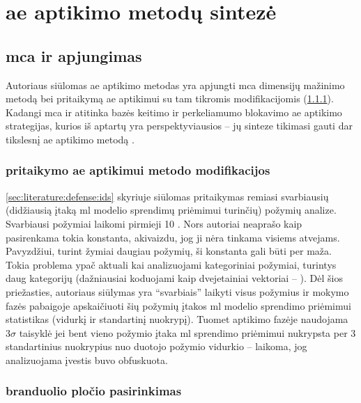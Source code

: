 \section{\gls{ae} aptikimo metodų sintezė}

\subsection{\gls{mca} ir \LIME apjungimas}
Autoriaus siūlomas \gls{ae} aptikimo metodas yra apjungti \gls{mca} dimensijų mažinimo metodą bei \LIME pritaikymą \gls{ae} aptikimui su tam tikromis modifikacijomis (\ref{sec:method:mods}). Kadangi \gls{mca} ir \LIME atitinka bazės keitimo  ir perkeliamumo blokavimo  \gls{ae} aptikimo strategijas, kurios iš aptartų yra perspektyviausios -- jų sinteze tikimasi gauti dar tikslesnį \gls{ae} aptikimo metodą .

\subsubsection{\LIME pritaikymo \gls{ae} aptikimui metodo modifikacijos}\label{sec:method:mods}
\ref{sec:literature:defense:ids} skyriuje siūlomas \LIME pritaikymas remiasi svarbiausių (didžiausią įtaką \gls{ml} modelio sprendimų priėmimui turinčių) požymių analize. Svarbiausi požymiai laikomi pirmieji 10 \cite{tcydenovaDetectionAdversarialAttacks2021}. Nors autoriai neaprašo kaip pasirenkama tokia konstanta, akivaizdu, jog ji nėra tinkama visiems atvejams. Pavyzdžiui, turint žymiai daugiau požymių, ši konstanta gali būti per maža. Tokia problema ypač aktuali kai analizuojami kategoriniai požymiai, turintys daug kategorijų (dažniausiai koduojami kaip dvejetainiai vektoriai -- ). Dėl šios priežasties, autoriaus siūlymas yra \enquote{svarbiais} laikyti visus požymius ir mokymo fazės pabaigoje apskaičiuoti šių požymių įtakos \gls{ml} modelio sprendimo priėmimui statistikas (vidurkį ir standartinį nuokrypį). Tuomet aptikimo fazėje naudojama $3 \sigma$ taisyklė \cite{pukelsheimThreeSigmaRule1994} \ty jei bent vieno požymio įtaka \gls{ml} sprendimo priėmimui nukrypsta per 3 standartinius nuokrypius nuo duotojo požymio vidurkio -- laikoma, jog analizuojama įvestis buvo obfuskuota.

\subsubsection{\LIME branduolio pločio pasirinkimas}


